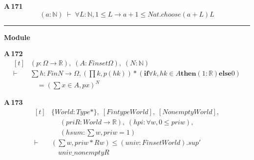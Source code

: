 \noindent\textbf{A\,171}\quad{}
{\footnotesize\[ (\mathit{a} : \mathbb{N} ) \;\vdash\; \forall \mathit{L} : \mathbb{N} , 1 \leq \mathit{L} \to \mathit{a} + 1 \leq \mathit{Nat}.\mathit{choose} (\mathit{a} + \mathit{L}) \mathit{L} \]}

\vspace{4pt}\noindent\rule{\columnwidth}{0.4pt}\par\vspace{2pt}
\noindent\textbf{Module }\par\vspace{3pt}

\noindent\textbf{A\,172}\quad{}
{\footnotesize\[ \begin{aligned}[t]
&(\mathit{p} : \Omega \to \mathbb{R} ),\; (\mathit{A} : \mathit{Finset} \Omega ),\; (\mathit{N} : \mathbb{N} )\\
\vdash\;&\textstyle\sum \mathit{h} : \mathit{Fin} \mathit{N} \to \Omega , (\textstyle\prod \mathit{k}, \mathit{p} (\mathit{h} \mathit{k})) * (\mathbf{if} \forall \mathit{k}, \mathit{h} \mathit{k} \in \mathit{A} \mathbf{then} (1:\mathbb{R} ) \mathbf{else} 0)\\
&\quad = (\textstyle\sum \mathit{x} \in \mathit{A}, \mathit{p} \mathit{x}) ^{\mathit{N}}
\end{aligned} \]}

\noindent\textbf{A\,173}\quad{}
{\footnotesize\[ \begin{aligned}[t]
&\{ \mathit{World} : \mathit{Type}*\},\; [\mathit{Fintype} \mathit{World}],\; [\mathit{Nonempty} \mathit{World}],\\
&\quad \; (\mathit{pri} \mathit{R} : \mathit{World} \to \mathbb{R} ),\; (\mathit{hpi} : \forall \mathit{w}, 0 \leq \mathit{pri} \mathit{w}),\\
&\quad \; (\mathit{hsum} : \textstyle\sum \mathit{w}, \mathit{pri} \mathit{w} = 1)\\
\vdash\;&(\textstyle\sum \mathit{w}, \mathit{pri} \mathit{w} * \mathit{R} \mathit{w}) \leq (\mathit{univ} : \mathit{Finset} \mathit{World}).\mathit{sup'}\\
&\quad \mathit{univ\_nonempty} \mathit{R}
\end{aligned} \]}

